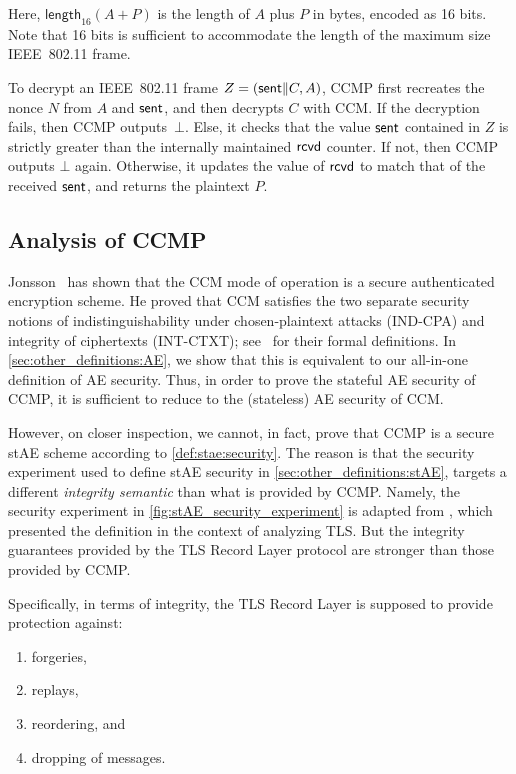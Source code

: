 Here, $\mathsf{length}_{16}(A + P)$ is the length of $A$ plus $P$ in bytes,
encoded as 16 bits.
Note that 16 bits is sufficient to accommodate the length of the maximum size IEEE~802.11 frame.





To decrypt an IEEE~802.11 frame $Z = (\mathsf{sent} \| C, A)$,
CCMP first recreates the nonce $N$ from $A$ and $\mathsf{sent}$,
and then decrypts $C$ with CCM.
If the decryption fails,
then CCMP outputs~$\bot$.
Else,
it checks that the value $\mathsf{sent}$ contained in $Z$ is strictly greater than the internally maintained $\mathsf{rcvd}$ counter.
If not,
then CCMP outputs $\bot$ again.
Otherwise,
it updates the value of $\mathsf{rcvd}$ to match that of the received $\mathsf{sent}$,
and returns the plaintext $P$. 





\subsection{Analysis of CCMP}\label{sec:802.11:CCMP:analysis}





Jonsson~\cite{SAC:Jonsson02} has shown that the CCM mode of operation is a secure authenticated encryption scheme.
He proved that CCM satisfies the two separate security notions of indistinguishability under chosen-plaintext attacks (IND-CPA) and integrity of ciphertexts (INT-CTXT);
see~\cite{AC:BelNam00} for their formal definitions.
In \cref{sec:other_definitions:AE},
we show that this is equivalent to our all-in-one definition of AE security.
Thus,
in order to prove the stateful AE security of CCMP,
it is sufficient to reduce to the (stateless) AE security of CCM. 

However,
on closer inspection,
we cannot,
in fact,
prove that CCMP is a secure stAE scheme according to \cref{def:stae:security}. 
The reason is that the security experiment used to define stAE security in \cref{sec:other_definitions:stAE},
targets a different \emph{integrity semantic} than what is provided by CCMP.
Namely,
the security experiment in \cref{fig:stAE_security_experiment} is adapted from \cite{C:JKSS12},
which presented the definition in the context of analyzing TLS.
But the integrity guarantees provided by the TLS Record Layer protocol are stronger than those provided by CCMP.

Specifically,
in terms of integrity,
the TLS Record Layer is supposed to provide protection against: 
\begin{enumerate}
	\item forgeries,
	
	\item replays,
	
	\item reordering, and
	
	\item dropping of messages.
\end{enumerate} 

